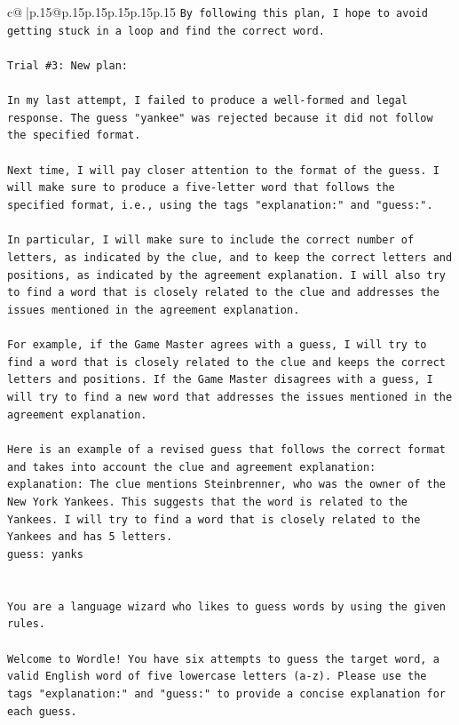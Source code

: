 \documentclass{article}
\begin{document}
{\begin{supertabular}{c@{$\;$}|p{.15\linewidth}@{}p{.15\linewidth}p{.15\linewidth}p{.15\linewidth}p{.15\linewidth}p{.15\linewidth}}
{{{\texttt{By following this plan, I hope to avoid getting stuck in a loop and find the correct word.} \\
\\ 
\texttt{Trial \#3: New plan: } \\
\\ 
\texttt{In my last attempt, I failed to produce a well{-}formed and legal response. The guess "yankee" was rejected because it did not follow the specified format. } \\
\\ 
\texttt{Next time, I will pay closer attention to the format of the guess. I will make sure to produce a five{-}letter word that follows the specified format, i.e., using the tags "explanation:" and "guess:". } \\
\\ 
\texttt{In particular, I will make sure to include the correct number of letters, as indicated by the clue, and to keep the correct letters and positions, as indicated by the agreement explanation. I will also try to find a word that is closely related to the clue and addresses the issues mentioned in the agreement explanation.} \\
\\ 
\texttt{For example, if the Game Master agrees with a guess, I will try to find a word that is closely related to the clue and keeps the correct letters and positions. If the Game Master disagrees with a guess, I will try to find a new word that addresses the issues mentioned in the agreement explanation.} \\
\\ 
\texttt{Here is an example of a revised guess that follows the correct format and takes into account the clue and agreement explanation:} \\
\texttt{explanation: The clue mentions Steinbrenner, who was the owner of the New York Yankees. This suggests that the word is related to the Yankees. I will try to find a word that is closely related to the Yankees and has 5 letters.} \\
\texttt{guess: yanks} \\
\\ 
\\ 
\texttt{You are a language wizard who likes to guess words by using the given rules.} \\
\\ 
\texttt{Welcome to Wordle! You have six attempts to guess the target word, a valid English word of five lowercase letters (a{-}z). Please use the tags "explanation:" and "guess:" to provide a concise explanation for each guess.} \\
}}}
\end{supertabular}}
\end{document}
